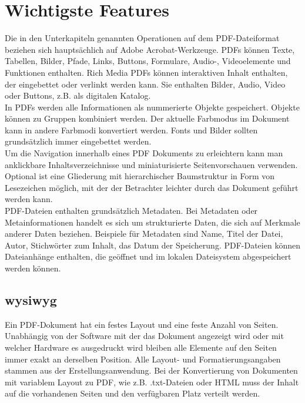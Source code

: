 \section{Wichtigste Features}
Die in den Unterkapiteln genannten Operationen auf dem PDF-Dateiformat beziehen sich hauptsächlich auf Adobe Acrobat-Werkzeuge. PDFs können Texte, Tabellen, Bilder, Pfade, Links, Buttons, Formulare, Audio-, Videoelemente und Funktionen enthalten. Rich Media PDFs können interaktiven Inhalt enthalten, der eingebettet oder verlinkt werden kann. Sie enthalten Bilder, Audio, Video oder Buttons, z.B. als digitalen Katalog. \cite{wiki-pdf-engl} \\ 
In PDFs werden alle Informationen als nummerierte Objekte gespeichert. Objekte können zu Gruppen kombiniert werden. Der aktuelle Farbmodus im Dokument kann in andere Farbmodi konvertiert werden. Fonts und Bilder sollten grundsätzlich immer eingebettet werden. \\
Um die Navigation innerhalb eines PDF Dokuments zu erleichtern kann man anklickbare Inhaltsverzeichnisse und miniaturisierte Seitenvorschauen verwenden. Optional ist eine Gliederung mit hierarchischer Baumstruktur in Form von Lesezeichen möglich, mit der der Betrachter leichter durch das Dokument geführt werden kann. \\
PDF-Dateien enthalten grundsätzlich Metadaten. Bei Metadaten oder Metainformationen handelt es sich um strukturierte Daten, die sich auf Merkmale anderer Daten beziehen. Beispiele für Metadaten sind Name, Titel der Datei, Autor, Stichwörter zum Inhalt, das Datum der Speicherung. PDF-Dateien können Dateianhänge enthalten, die geöffnet und im lokalen Dateisystem abgespeichert werden können. \cite{wiki-pdf-engl}

\subsection{\gls{wysiwyg}}
Ein PDF-Dokument hat ein festes Layout und eine feste Anzahl von Seiten. Unabhängig von der Software mit der das Dokument angezeigt wird oder mit welcher Hardware es ausgedruckt wird bleiben alle Elemente auf den Seiten immer exakt an derselben Position. Alle Layout- und Formatierungsangaben stammen aus der Erstellungsanwendung. Bei der Konvertierung von Dokumenten mit variablem Layout zu PDF, wie z.B. .txt-Dateien oder HTML muss der Inhalt auf die vorhandenen Seiten und den verfügbaren Platz verteilt werden. 

